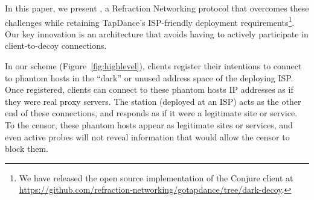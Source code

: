 \documentclass[sigconf]{acmart}
\newcommand{\TODO}[1]{}
\renewcommand{\TODO}[1]{{\color{red} TODO: {#1}}}
\begin{document}



\smallskip

In this paper, we present \textbf{\scheme}, a Refraction
Networking protocol that overcomes these challenges while retaining
TapDance's ISP-friendly deployment requirements\footnote{
We have released the open source implementation of the Conjure client at 
\url{https://github.com/refraction-networking/gotapdance/tree/dark-decoy}.}.
Our key innovation is an architecture that avoids
having to actively participate in client-to-decoy connections.

In our scheme (Figure~\ref{fig:highlevel}), clients
register their intentions to connect to phantom hosts in the ``dark''
or unused address space of the deploying ISP. Once registered, clients
can connect to these phantom hosts IP addresses as if they were real
proxy servers. The \scheme station (deployed at an ISP) acts as the other end of these connections, and
responds as if it were a legitimate site or service. To the censor,
these phantom hosts appear as legitimate sites or services, and even
active probes will not reveal information that would allow the censor to
block them.

\end{document}
